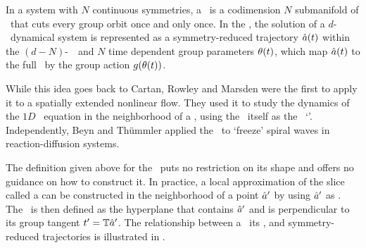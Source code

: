 In a system with $N$ continuous symmetries, a \emph{\slice} \pSRed\ is a codimension $N$ submanifold
of \pS\ that cuts every group orbit once and only once. In the \emph{\mslices}, the solution
of a $d$-\dmn\ dynamical system is represented as a symmetry-reduced trajectory $\hat{a} (t)$ within the
$(d-N)$-\dmn\ \slice\ and $N$ time dependent group parameters $\theta(t)$, which
map $\hat{a} (t)$ to the full \statesp\ by the group action $g(\theta(t))$.

While this idea goes back to Cartan,
Rowley and Marsden
were the first to apply it to a spatially extended nonlinear flow. They used it to study the dynamics of
the $1D$ \KS\ equation in the neighborhood of
a \reqv, using the \reqv\ itself as the \slice\ `\template'.
Independently, Beyn and Th\"{u}mmler applied
the \mslices\ to `freeze' spiral waves in reaction-diffusion systems.

The definition given above for the \slice\ puts no restriction on its shape
and offers no guidance on how to construct it. In practice, a
local approximation of the slice called a \emph{\slicePlane} can be constructed
in the neighborhood of a point ${\hat{a}'}$ by using ${\hat{a}'}$ as
\emph{\template}. The \slicePlane\ is then defined as the hyperplane that
contains ${\hat{a}'}$ and is perpendicular to its group tangent $t'_{}
= \mathbb{T} {\hat{a}'}$. The relationship between a \template\, its \slicePlane, and symmetry-reduced trajectories
is illustrated in .

